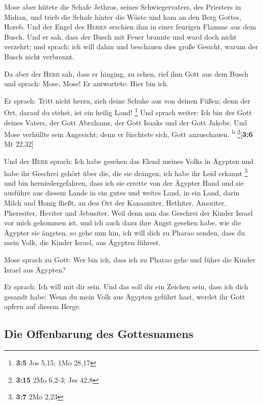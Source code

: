  Mose aber hütete die Schafe Jethros, seines
Schwiegervaters, des Priesters in Midian, und trieb die Schafe hinter
die Wüste und kam an den Berg Gottes, Horeb.  Und der
Engel des \textsc{Herrn} erschien ihm in einer feurigen Flamme aus dem
Busch. Und er sah, dass der Busch mit Feuer brannte und ward doch nicht
verzehrt;  und sprach: ich will dahin und beschauen dies
große Gesicht, warum der Busch nicht verbrennt.

 Da aber der \textsc{Herr} sah, dass er hinging, zu sehen,
rief ihm Gott aus dem Busch und sprach: Mose, Mose! Er antwortete: Hier
bin ich.

 Er sprach: Tritt nicht herzu, zieh deine Schuhe aus von
deinen Füßen; denn der Ort, darauf du stehst, ist ein heilig Land!
\footnote{\textbf{3:5} Jos 5,15; 1Mo 28,17}  Und sprach
weiter: Ich bin der Gott deines Vaters, der Gott Abrahams, der Gott
Isaaks und der Gott Jakobs. Und Mose verhüllte sein Angesicht; denn er
fürchtete sich, Gott anzuschauen. \textsuperscript{b}
\footnote{\textbf{3:15} 2Mo 6,2-3; Jes 42,8}{[}\textbf{3:6} Mt 22,32{]}

 Und der \textsc{Herr} sprach: Ich habe gesehen das Elend
meines Volks in Ägypten und habe ihr Geschrei gehört über die, die sie
drängen; ich habe ihr Leid erkannt \footnote{\textbf{3:7} 2Mo 2,23}
 und bin herniedergefahren, dass ich sie errette von der
Ägypter Hand und sie ausführe aus diesem Lande in ein gutes und weites
Land, in ein Land, darin Milch und Honig fließt, an den Ort der
Kanaaniter, Hethiter, Amoriter, Pheresiter, Heviter und Jebusiter.
 Weil denn nun das Geschrei der Kinder Israel vor mich
gekommen ist, und ich auch dazu ihre Angst gesehen habe, wie die Ägypter
sie ängsten,  so gehe nun hin, ich will dich zu Pharao
senden, dass du mein Volk, die Kinder Israel, aus Ägypten führest.

 Mose sprach zu Gott: Wer bin ich, dass ich zu Pharao
gehe und führe die Kinder Israel aus Ägypten?

 Er sprach: Ich will mit dir sein. Und das soll dir ein
Zeichen sein, dass ich dich gesandt habe: Wenn du mein Volk aus Ägypten
geführt hast, werdet ihr Gott opfern auf diesem Berge.

\hypertarget{die-offenbarung-des-gottesnamens}{%
\subsection{Die Offenbarung des
Gottesnamens}\label{die-offenbarung-des-gottesnamens}}

